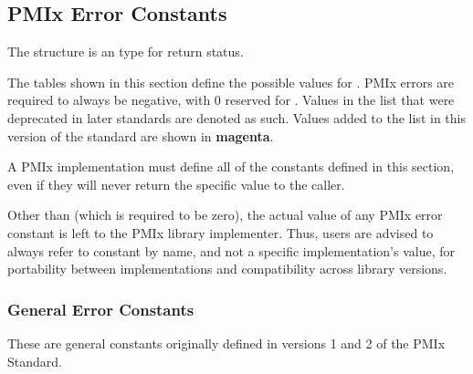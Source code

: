 \subsection{PMIx Error Constants}
\label{api:struct:errors}

The  structure is an  type for return status.

The tables shown in this section define the possible values for .
PMIx errors are required to always be negative, with 0 reserved for . Values in the list that were deprecated in later standards are denoted as such. Values added to the list in this version of the standard are shown in \textbf{\color{magenta}magenta}.

\adviceimplstart
A PMIx implementation must define all of the constants defined in this section, even if they will never return the specific value to the caller.
\adviceimplend

\adviceuserstart
Other than  (which is required to be zero), the actual value of any \ac{PMIx} error constant is left to the \ac{PMIx} library implementer. Thus, users are advised to always refer to constant by name, and not a specific implementation's value, for portability between implementations and compatibility across library versions.
\adviceuserend

\subsubsection{General Error Constants}
\label{api:struct:generrors}

These are general constants originally defined in versions 1 and 2 of the PMIx Standard.


